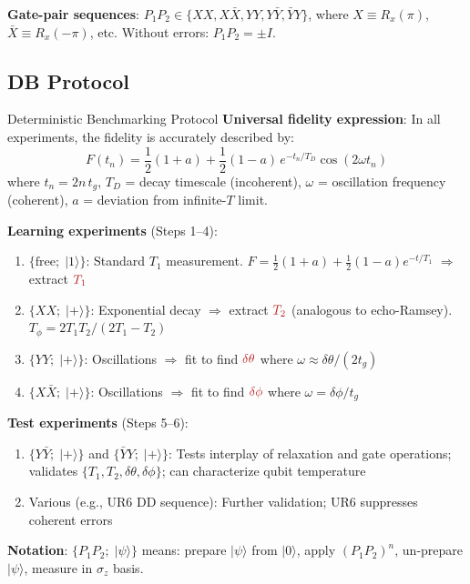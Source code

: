 \documentclass[10pt,a4paper]{article}
\begin{document}
\textbf{Gate-pair sequences}: $P_1 P_2 \in \{XX, X\bar{X}, YY, Y\bar{Y}, \bar{Y}Y\}$, where $X \equiv R_x(\pi)$, $\bar{X} \equiv R_x(-\pi)$, etc. Without errors: $P_1 P_2 = \pm I$.

\subsection{DB Protocol}

\begin{algorithmbox}{Deterministic Benchmarking Protocol}
\textbf{Universal fidelity expression}: In all experiments, the fidelity is accurately described by:
\[
  \boxed{F(t_n) = \frac{1}{2}(1+a) + \frac{1}{2}(1-a)\,e^{-t_n/T_D}\cos(2\omega t_n)}
\]
where $t_n = 2n\,t_g$, $T_D$ = decay timescale (incoherent), $\omega$ = oscillation frequency (coherent), $a$ = deviation from infinite-$T$ limit.

\textbf{Learning experiments} (Steps 1--4):
\begin{enumerate}
  \item $\{\mathrm{free};\; |1\rangle\}$: Standard $T_1$ measurement. $F = \frac{1}{2}(1+a) + \frac{1}{2}(1-a)e^{-t/T_1}$ $\Rightarrow$ extract $\textcolor{alertred}{T_1}$
  \item $\{XX;\; |+\rangle\}$: Exponential decay $\Rightarrow$ extract $\textcolor{alertred}{T_2}$ (analogous to echo-Ramsey). $T_\phi = 2T_1 T_2/(2T_1 - T_2)$
  \item $\{YY;\; |+\rangle\}$: Oscillations $\Rightarrow$ fit to find $\textcolor{alertred}{\delta\theta}$ where $\omega \approx \delta\theta/(2t_g)$
  \item $\{X\bar{X};\; |+\rangle\}$: Oscillations $\Rightarrow$ fit to find $\textcolor{alertred}{\delta\phi}$ where $\omega = \delta\phi/t_g$
\end{enumerate}

\textbf{Test experiments} (Steps 5--6):
\begin{enumerate}[resume]
  \item $\{Y\bar{Y};\; |+\rangle\}$ and $\{\bar{Y}Y;\; |+\rangle\}$: Tests interplay of relaxation and gate operations; validates $\{T_1,T_2,\delta\theta,\delta\phi\}$; can characterize qubit temperature
  \item Various (e.g., UR6 DD sequence): Further validation; UR6 suppresses coherent errors
\end{enumerate}

\textbf{Notation}: $\{P_1 P_2;\; |\psi\rangle\}$ means: prepare $|\psi\rangle$ from $|0\rangle$, apply $(P_1 P_2)^n$, un-prepare $|\psi\rangle$, measure in $\sigma_z$ basis.
\end{algorithmbox}
\end{document}
